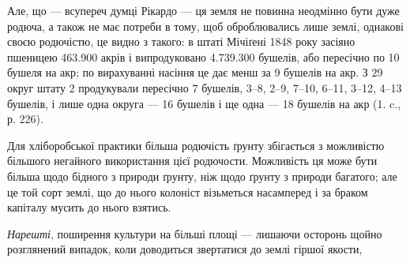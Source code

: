 Але, що — всупереч думці Рікардо — ця земля не повинна неодмінно бути
дуже родюча, а також не має потреби в тому, щоб оброблювались лише землі,
однакові своєю родючістю, це видно з такого: в штаті Мічіґені 1848 року засіяно
пшеницею 463.900 акрів і випродуковано 4.739.300 бушелів, або пересічно по
10 бушеля на акр; по вирахуванні насіння це дає менш за 9 бушелів на
акр. З 29 округ штату 2 продукували пересічно 7 бушелів, 3--8, 2--9, 7--10, 6--11, 3--12, 4--13 бушелів, і
лише одна округа — 16 бушелів і ще одна — 18 бушелів на акр (1. c., р. 226).

Для хліборобської практики більша родючість ґрунту збігається з можливістю
більшого негайного використання цієї родючости. Можливість ця може бути
більша щодо бідного з природи ґрунту, ніж щодо ґрунту з природи багатого;
але це той сорт землі, що до нього колоніст візьметься насамперед і за браком
капіталу мусить до нього взятись.

\emph{Нарешті}, поширення культури на більші площі — лишаючи осторонь щойно розглянений випадок, коли
доводиться звертатися до землі гіршої якости,
\parbreak{}  %
